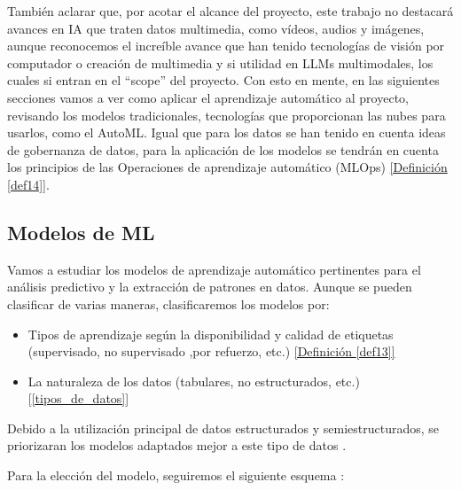 También aclarar que, por acotar el alcance del proyecto, este trabajo no destacará avances en IA que traten datos multimedia, como vídeos, audios y imágenes, aunque reconocemos el increíble avance que han tenido tecnologías de visión por computador o creación de multimedia y si utilidad en LLMs multimodales, los cuales si entran en el ``scope'' del proyecto. Con esto en mente, en las siguientes secciones vamos a ver como aplicar el aprendizaje automático al proyecto, revisando los modelos tradicionales, tecnologías que proporcionan las nubes para usarlos, como el AutoML. Igual que para los datos se han tenido en cuenta ideas de gobernanza de datos, para la aplicación de los modelos se tendrán en cuenta los principios de las Operaciones de aprendizaje automático (MLOps) \hyperref[def14]{[Definición \ref*{def14}]}.

\subsection{Modelos de ML}

Vamos a estudiar los modelos de aprendizaje automático pertinentes para el análisis predictivo y la extracción de patrones en datos. Aunque se pueden clasificar de varias maneras, clasificaremos los modelos por:
\begin{itemize}
	\item Tipos de aprendizaje según la disponibilidad y calidad de etiquetas (supervisado, no supervisado ,por refuerzo, etc.) \hyperref[def13]{[Definición \ref*{def13}]}
	\item La naturaleza de los datos (tabulares, no estructurados, etc.) [\ref{tipos_de_datos}]
\end{itemize}
Debido a la utilización principal de datos estructurados y semiestructurados, se priorizaran los modelos adaptados mejor a este tipo de datos \citep{Fowdur2021}.

Para la elección del modelo, seguiremos el siguiente esquema \citep{Jason2024MLTypes}:

